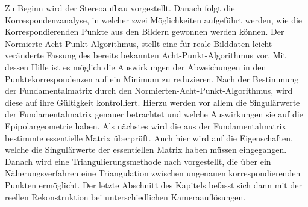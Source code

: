 
Zu Beginn wird der Stereoaufbau vorgestellt. Danach folgt die Korrespondenzanalyse, in welcher zwei Möglichkeiten aufgeführt werden, wie die Korrespondierenden Punkte aus den Bildern gewonnen werden können. Der Normierte-Acht-Punkt-Algorithmus, stellt eine für reale Bilddaten leicht veränderte Fassung des bereits bekannten Acht-Punkt-Algorithmus vor. Mit dessen Hilfe ist es möglich die Auswirkungen der Abweichungen in den Punktekorrespondenzen auf ein Minimum zu reduzieren. Nach der Bestimmung der Fundamentalmatrix durch den Normierten-Acht-Punkt-Algorithmus, wird diese auf ihre Gültigkeit kontrolliert. Hierzu werden vor allem die Singulärwerte der Fundamentalmatrix genauer betrachtet und welche Auswirkungen sie auf die Epipolargeometrie haben. Als nächstes wird die aus der Fundamentalmatrix bestimmte essentielle Matrix überprüft. Auch hier wird auf die Eigenschaften, welche die Singulärwerte der essentiellen Matrix haben müssen eingegangen. Danach wird eine Triangulierungsmethode nach \cite{HZ} vorgestellt, die über ein Näherungsverfahren eine Triangulation zwischen ungenauen korrespondierenden Punkten ermöglicht. Der letzte Abschnitt des Kapitels befasst sich dann mit der reellen Rekonstruktion bei unterschiedlichen Kameraauflösungen. \\



%
%
%
%
%
%


